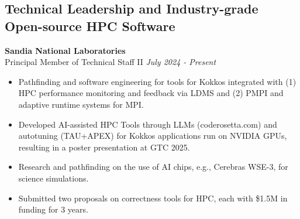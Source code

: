 



\newcommand{\myExpOne}{
\item Pathfinding and software engineering for tools for Kokkos integrated with (1) HPC performance monitoring and feedback via LDMS and (2) PMPI and adaptive runtime systems for MPI.
\item Developed AI-assisted HPC Tools through LLMs (coderosetta.com) and autotuning (TAU+APEX) for Kokkos applications run on NVIDIA GPUs, resulting in a poster presentation at GTC 2025. 
\item Research and pathfinding on the use of AI chips, e.g., Cerebras WSE-3, for science simulations. 
\item Submitted two proposals on correctness tools for HPC, each with \$1.5M in funding for 3 years. 
}

\subsection*{Technical Leadership and Industry-grade Open-source HPC Software}
\textbf{Sandia National Laboratories}\\
{Principal Member of Technical Staff II} \hfill \textit{July 2024 - Present}
\noindent
\begin{itemize}[itemsep=-0.1em]\onlyitems[include={1,2}]
\myExpOne
\end{itemize}


\newcommand{\myExpTwo}{
	\item Developed and maintained Kokkos Tools for the CMake and Spack build system, tooling overheads, CI/CD, auto-tuning, and nvtx/roctx/vtune integration, leading to 15 merged github PRs.
   \item Developed a debugging tool that detected 7 common Kokkos user bugs by analyzing LLVM IR of Kokkos programs via symbolic execution, leading to a paper at SC24's Correctness workshop. 
    \item Implemented new features in LLVM OpenMP, leading to a 1.2x speedup for a Kokkos-OpenMP+CUDA benchmark, 3 OpenMP 6.0 features, and 19 feature proposals for OpenMP 6.1.
}

